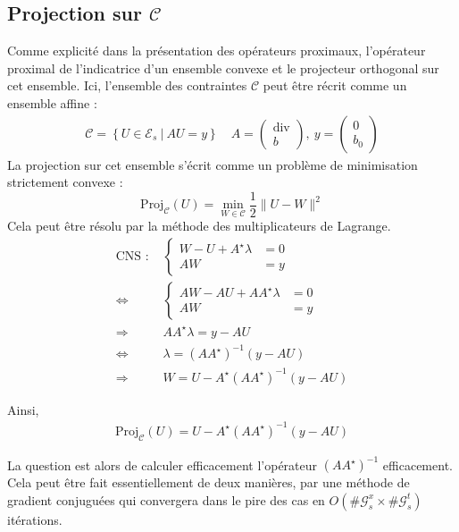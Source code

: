 \documentclass[a4paper,12pt]{article}
\renewcommand{\div}{\text{div}}
\newcommand{\proj}{\text{Proj}}
\begin{document}
\subsection{Projection sur $\mathcal{C}$}
Comme explicité dans la présentation des opérateurs proximaux, l'opérateur proximal de l'indicatrice d'un ensemble convexe et le projecteur orthogonal sur cet ensemble. Ici, l'ensemble des contraintes $\mathcal{C}$ peut être récrit comme un ensemble affine : 
\begin{align}
\mathcal{C}=\left\{U\in\mathcal{E}_s\ |\ AU=y\right\} \quad A=\begin{pmatrix}
\div \\
b
\end{pmatrix},\ y=\begin{pmatrix}
0 \\
b_0
\end{pmatrix}
\end{align}
La projection sur cet ensemble s'écrit comme un problème de minimisation strictement convexe : 
$$
\proj_{\mathcal{C}}(U) = \min_{W\in\mathcal{C}}\frac{1}{2}\|U-W\|^2
$$
Cela peut être résolu par la méthode des multiplicateurs de Lagrange. 
\begin{align*}
\text{CNS : } & \left\{ \begin{array}{rl}
W-U+A^{\star}\lambda &=0\\
AW&=y
\end{array}\right.\\
\Longleftrightarrow\quad & \left\{ \begin{array}{rl}
AW-AU+AA^{\star}\lambda &=0\\
AW&=y
\end{array}\right.\\
\Longrightarrow\quad & AA^{\star}\lambda = y-AU \\
\Longleftrightarrow\quad & \lambda = (AA^{\star})^{-1}(y-AU) \\
\Longrightarrow\quad & W = U - A^{\star} (AA^{\star})^{-1}(y-AU)
\end{align*}

Ainsi, 
\begin{align}
\proj_{\mathcal{C}}(U) = U - A^{\star} (AA^{\star})^{-1}(y-AU)
\end{align}

La question est alors de calculer efficacement l'opérateur $(AA^{\star})^{-1}$ efficacement. Cela peut être fait essentiellement de deux manières, par une méthode de gradient conjuguées qui convergera dans le pire des cas en $O(\#\mathcal{G}_s^x\times \#\mathcal{G}_s^t)$ itérations.\\
\end{document}
